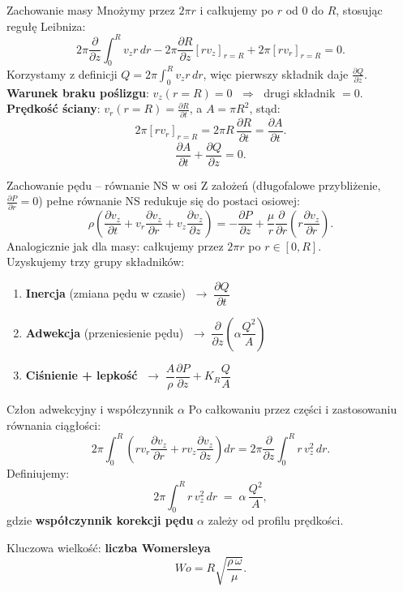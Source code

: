 \documentclass[aspectratio=169]{beamer}
\begin{document}
\begin{frame}{Zachowanie masy}
  Mnożymy przez $2\pi r$ i całkujemy po $r$ od $0$ do $R$, stosując regułę Leibniza:
  \[
    2\pi\frac{\partial}{\partial z}\int_{0}^{R} v_z r\,dr
    - 2\pi\frac{\partial R}{\partial z}[r v_z]_{r=R}
    + 2\pi[r v_r]_{r=R} = 0.
  \]
  \vspace{0.2em}
  Korzystamy z definicji $Q = 2\pi\!\int_0^R v_z r\,dr$, więc pierwszy składnik daje $\frac{\partial Q}{\partial z}$.\\[0.5em]

  \textbf{Warunek braku poślizgu}: $v_z(r=R)=0$ $\;\Rightarrow\;$ drugi składnik $= 0$.\\[0.3em]
  \textbf{Prędkość ściany}: $v_r(r=R)=\frac{\partial R}{\partial t}$, a $A=\pi R^2$, stąd:
  \[
    2\pi[r v_r]_{r=R} = 2\pi R\,\frac{\partial R}{\partial t} = \frac{\partial A}{\partial t}.
  \]
    \[\boxed{
      \frac{\partial A}{\partial t} + \frac{\partial Q}{\partial z} = 0.}
    \]
\end{frame}

\begin{frame}{Zachowanie pędu – równanie NS w osi}
  Z założeń (długofalowe przybliżenie, $\frac{\partial P}{\partial r}=0$) pełne równanie NS redukuje się do postaci osiowej:
    \[
      \rho\!\left(\frac{\partial v_z}{\partial t}
      + v_r\frac{\partial v_z}{\partial r}
      + v_z\frac{\partial v_z}{\partial z}\right)
      = -\frac{\partial P}{\partial z}
      + \frac{\mu}{r}\frac{\partial}{\partial r}\!\left(r\frac{\partial v_z}{\partial r}\right).
    \]
  \vspace{0.5em}
  Analogicznie jak dla masy: całkujemy przez $2\pi r$ po $r\in[0,R]$.\\[0.5em]
  Uzyskujemy trzy grupy składników:
  \begin{enumerate}
    \item \textbf{Inercja} (zmiana pędu w czasie) $\;\to\; \dfrac{\partial Q}{\partial t}$
    \item \textbf{Adwekcja} (przeniesienie pędu) $\;\to\; \dfrac{\partial}{\partial z}\!\left(\alpha\dfrac{Q^2}{A}\right)$
    \item \textbf{Ciśnienie + lepkość} $\;\to\; \dfrac{A}{\rho}\dfrac{\partial P}{\partial z} + K_R\dfrac{Q}{A}$
  \end{enumerate}
\end{frame}

\begin{frame}{Człon adwekcyjny i współczynnik $\alpha$}
  Po całkowaniu przez części i zastosowaniu równania ciągłości:
  \[
    2\pi\int_0^R\!\left(r v_r\frac{\partial v_z}{\partial r}
    +r v_z\frac{\partial v_z}{\partial z}\right)dr
    = 2\pi\frac{\partial}{\partial z}\int_0^R r\,v_z^2\,dr.
  \]
  Definiujemy:
  \[
    2\pi\int_0^R r\,v_z^2\,dr \;=\; \alpha\,\frac{Q^2}{A},
  \]
  gdzie \textbf{współczynnik korekcji pędu} $\alpha$ zależy od profilu prędkości.

  \vspace{0.4em}
  Kluczowa wielkość: \textbf{liczba Womersleya}
  \[
    Wo = R\sqrt{\frac{\rho\,\omega}{\mu}}.
  \]

\end{frame}
\end{document}

